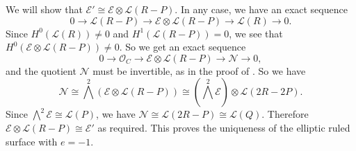 {
We will show that $\mathcal E'\cong\mathcal E\otimes\mathcal L(R-P)$. In any case, we have an exact sequence
\[
0\to\mathcal L(R-P)\to\mathcal E\otimes\mathcal L(R-P)\to\mathcal L(R)\to0.
\]
Since $H^0(\mathcal L(R))\ne0$ and $H^1(\mathcal L(R-P))=0$, we see that $H^0(\mathcal E\otimes\mathcal L(R-P))\ne0$. So we get an exact sequence
\[
0\to\mathcal O_C\to\mathcal E\otimes\mathcal L(R-P)\to\mathcal N\to0,
\]
and the quotient $\mathcal N$ must be invertible, as in the proof of . So we have
\[
\mathcal N\cong\bigwedge^2(\mathcal E\otimes\mathcal L(R-P))\cong
(\bigwedge^2\mathcal E)\otimes\mathcal L(2R-2P).
\]
Since $\bigwedge^2\mathcal E\cong\mathcal L(P)$, we have $\mathcal N\cong\mathcal L(2R-P)\cong\mathcal L(Q)$. Therefore $\mathcal E\otimes\mathcal L(R-P)\cong\mathcal E'$ as required. This proves the uniqueness of the elliptic ruled surface with $e=-1$.
}
